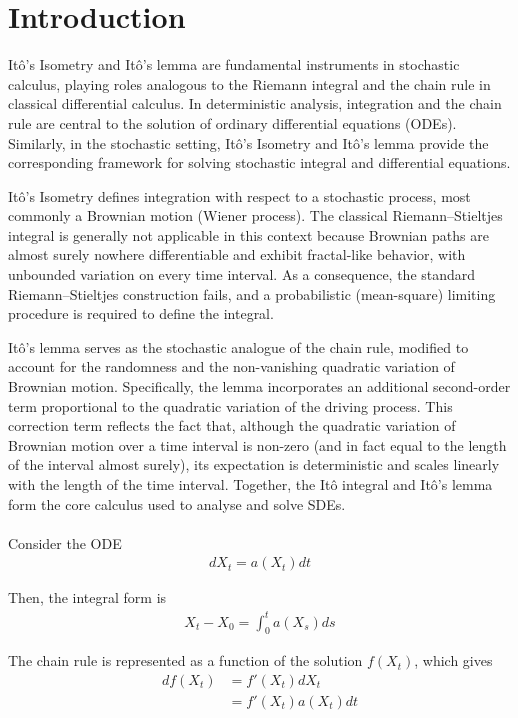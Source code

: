 \section{Introduction}
Itô's Isometry and Itô’s lemma are fundamental instruments in stochastic calculus, playing roles analogous to the Riemann integral and the chain rule in classical differential calculus. In deterministic analysis, integration and the chain rule are central to the solution of ordinary differential equations (ODEs). Similarly, in the stochastic setting, Itô's Isometry and Itô’s lemma provide the corresponding framework for solving stochastic integral and differential equations.

Itô's Isometry defines integration with respect to a stochastic process, most commonly a Brownian motion (Wiener process). The classical Riemann–Stieltjes integral \cite{wiki:riemann-stieltjes} is generally not applicable in this context because Brownian paths are almost surely nowhere differentiable and exhibit fractal-like behavior, with unbounded variation on every time interval. As a consequence, the standard Riemann–Stieltjes construction fails, and a probabilistic (mean-square) limiting procedure is required to define the integral.

Itô’s lemma serves as the stochastic analogue of the chain rule, modified to account for the randomness and the non-vanishing quadratic variation of Brownian motion. Specifically, the lemma incorporates an additional second-order term proportional to the quadratic variation of the driving process. This correction term reflects the fact that, although the quadratic variation of Brownian motion over a time interval is non-zero (and in fact equal to the length of the interval almost surely), its expectation is deterministic and scales linearly with the length of the time interval. Together, the Itô integral and Itô’s lemma form the core calculus used to analyse and solve SDEs.
\\\\
Consider the ODE
\begin{align*}
dX_t = a(X_t)dt
\end{align*}

Then, the integral form is
\begin{align*}
X_t - X_0 = \int_0^t a(X_s)ds
\end{align*}

The chain rule is represented as a function of the solution $f(X_t)$, which gives
\begin{align*}
df(X_t)&=f'(X_t)dX_t\\
&=f'(X_t)a(X_t)dt
\end{align*}

